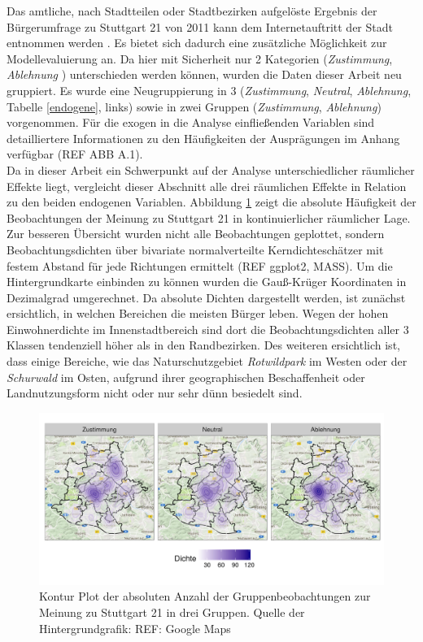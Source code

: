 \documentclass{Vorlage}
\begin{document}
Das amtliche, nach Stadtteilen oder Stadtbezirken aufgelöste Ergebnis der Bürgerumfrage zu Stuttgart 21 von 2011 kann dem Internetauftritt der Stadt entnommen werden \cite{Amt}. Es bietet sich dadurch eine zusätzliche Möglichkeit zur Modellevaluierung an. Da hier mit Sicherheit nur 2 Kategorien (\textit{Zustimmung}, \textit{Ablehnung }) unterschieden werden können, wurden die Daten dieser Arbeit neu gruppiert. Es wurde eine Neugruppierung in 3 (\textit{Zustimmung}, \textit{Neutral}, \textit{Ablehnung}, Tabelle \ref{endogene}, links) sowie in zwei Gruppen (\textit{Zustimmung}, \textit{Ablehnung}) vorgenommen. Für die exogen in die Analyse einfließenden Variablen sind detailliertere Informationen zu den Häufigkeiten der Ausprägungen im Anhang verfügbar (REF ABB A.1).\\
Da in dieser Arbeit ein Schwerpunkt auf der Analyse unterschiedlicher räumlicher Effekte liegt, vergleicht dieser Abschnitt alle drei räumlichen Effekte in Relation zu den beiden endogenen Variablen. Abbildung \ref{XYStuttgart3} zeigt die absolute Häufigkeit der Beobachtungen der Meinung zu Stuttgart 21 in kontinuierlicher räumlicher Lage. Zur besseren Übersicht wurden nicht alle Beobachtungen geplottet, sondern Beobachtungsdichten über bivariate normalverteilte Kerndichteschätzer mit festem Abstand für jede Richtungen ermittelt (REF ggplot2, MASS). Um die Hintergrundkarte einbinden zu können wurden die Gauß-Krüger Koordinaten in Dezimalgrad umgerechnet. Da absolute Dichten dargestellt werden, ist zunächst ersichtlich, in welchen Bereichen die meisten Bürger leben. Wegen der hohen Einwohnerdichte im Innenstadtbereich sind dort die Beobachtungsdichten aller 3 Klassen tendenziell höher als in den Randbezirken. Des weiteren ersichtlich ist, dass einige Bereiche, wie das Naturschutzgebiet \textit{Rotwildpark} im Westen oder der \textit{Schurwald} im Osten, aufgrund ihrer geographischen Beschaffenheit oder Landnutzungsform nicht oder nur sehr dünn besiedelt sind.

\begin{figure}[h]
 \begin{center}
 \includegraphics[scale=0.8]{Pictures/XYStuttgart3.png}
 \caption{Kontur Plot der absoluten Anzahl der Gruppenbeobachtungen zur Meinung zu Stuttgart 21 in drei Gruppen. Quelle der Hintergrundgrafik: REF: Google Maps}
 \label{XYStuttgart3}
 \end{center}
\end{figure}
\end{document}
